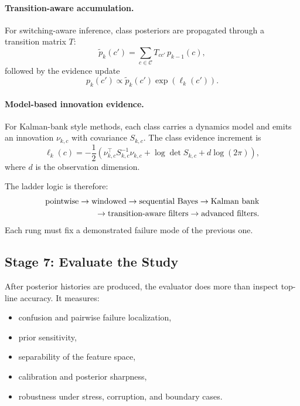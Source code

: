 \documentclass[11pt]{article}
\begin{document}
\paragraph{Transition-aware accumulation.}
For switching-aware inference, class posteriors are propagated through a transition matrix \(T\):
\begin{equation}
\tilde{p}_k(c') = \sum_{c \in \mathcal{C}} T_{cc'} \, p_{k-1}(c),
\end{equation}
followed by the evidence update
\begin{equation}
p_k(c') \propto \tilde{p}_k(c') \exp(\ell_k(c')).
\end{equation}

\paragraph{Model-based innovation evidence.}
For Kalman-bank style methods, each class carries a dynamics model and emits an innovation \(\nu_{k,c}\) with covariance \(S_{k,c}\). The class evidence increment is
\begin{equation}
\ell_k(c)
=
-\frac{1}{2}
\left(
\nu_{k,c}^{\top} S_{k,c}^{-1} \nu_{k,c}
+ \log \det S_{k,c}
+ d \log(2\pi)
\right),
\end{equation}
where \(d\) is the observation dimension.

The ladder logic is therefore:
\begin{align}
\text{pointwise}
\rightarrow
\text{windowed}
\rightarrow
\text{sequential Bayes}
\rightarrow
\text{Kalman bank}
\notag \\
\rightarrow
\text{transition-aware filters}
\rightarrow
\text{advanced filters}.
\end{align}
Each rung must fix a demonstrated failure mode of the previous one.

\subsection{Stage 7: Evaluate the Study}
After posterior histories are produced, the evaluator does more than inspect top-line accuracy. It measures:
\begin{itemize}[leftmargin=1.5em]
  \item confusion and pairwise failure localization,
  \item prior sensitivity,
  \item separability of the feature space,
  \item calibration and posterior sharpness,
  \item robustness under stress, corruption, and boundary cases.
\end{itemize}
\end{document}
